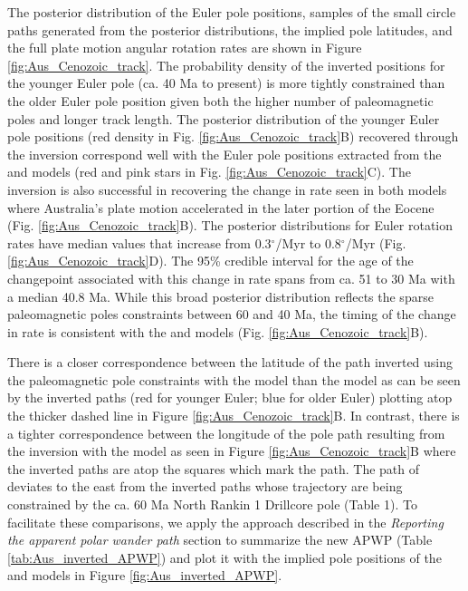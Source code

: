 \documentclass[11pt,letterpaper]{article}
\begin{document}
The posterior distribution of the Euler pole positions, samples of the small circle paths generated from the posterior distributions, the implied pole latitudes, and the full plate motion angular rotation rates are shown in Figure \ref{fig:Aus_Cenozoic_track}. The probability density of the inverted positions for the younger Euler pole (ca. 40 Ma to present) is more tightly constrained than the older Euler pole position given both the higher number of paleomagnetic poles and longer track length. The posterior distribution of the younger Euler pole positions (red density in Fig. \ref{fig:Aus_Cenozoic_track}B) recovered through the inversion correspond well with the Euler pole positions extracted from the \cite{Muller2016a} and \cite{Torsvik2017a} models (red and pink stars in Fig. \ref{fig:Aus_Cenozoic_track}C). The inversion is also successful in recovering the change in rate seen in both models where Australia's plate motion accelerated in the later portion of the Eocene (Fig. \ref{fig:Aus_Cenozoic_track}B). The posterior distributions for Euler rotation rates have median values that increase from 0.3$^\circ$/Myr to 0.8$^\circ$/Myr (Fig. \ref{fig:Aus_Cenozoic_track}D). The 95\% credible interval for the age of the changepoint associated with this change in rate spans from ca. 51 to 30 Ma with a median 40.8 Ma. While this broad posterior distribution reflects the sparse paleomagnetic poles constraints between 60 and 40 Ma, the timing of the change in rate is consistent with the \cite{Muller2016a} and \cite{Torsvik2017a} models (Fig. \ref{fig:Aus_Cenozoic_track}B). 

There is a closer correspondence between the latitude of the path inverted using the paleomagnetic pole constraints with the \cite{Muller2016a} model than the \cite{Torsvik2017a} model as can be seen by the inverted paths (red for younger Euler; blue for older Euler) plotting atop the thicker dashed line in Figure \ref{fig:Aus_Cenozoic_track}B. In contrast, there is a tighter correspondence between the longitude of the pole path resulting from the inversion with the \cite{Torsvik2017a} model as seen in Figure \ref{fig:Aus_Cenozoic_track}B where the inverted paths are atop the squares which mark the \cite{Torsvik2017a} path. The path of \cite{Muller2016a} deviates to the east from the inverted paths whose trajectory are being constrained by the ca. 60 Ma North Rankin 1 Drillcore pole (Table 1). To facilitate these comparisons, we apply the approach described in the \textit{Reporting the apparent polar wander path} section to summarize the new APWP (Table \ref{tab:Aus_inverted_APWP}) and plot it with the implied pole positions of the \cite{Muller2016a} and \cite{Torsvik2017a} models in Figure \ref{fig:Aus_inverted_APWP}.
\end{document}
